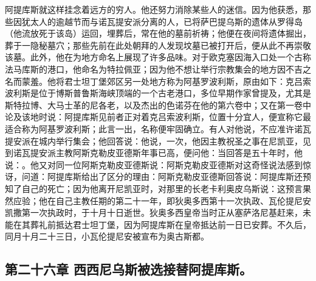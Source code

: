 阿提库斯就这样挂念着远方的穷人。他还努力消除某些人的迷信。因为他获悉，那些因犹太人的逾越节而与诺瓦提安派分离的人，已将萨巴提乌斯的遗体从罗得岛（他流放死于该岛）运回，埋葬后，常在他的墓前祈祷；他便在夜间将遗体掘出，葬于一隐秘墓穴；那些先前在此处朝拜的人发现坟墓已被打开后，便从此不再崇敬该墓。此外，他在为地方命名上展现了许多品味。对于欧克塞因海入口处一个古称法马库斯的港口，他命名为特拉佩亚；因为他不想让举行宗教集会的地方因不吉之名而蒙羞。他将君士坦丁堡郊区另一处地方称为阿基罗波利斯，原由如下：克吕索波利斯是位于博斯普鲁斯海峡顶端的一个古老港口，多位早期作家曾提及，尤其是斯特拉博、大马士革的尼各老，以及杰出的色诺芬在他的第六卷中；又在第一卷中论及该地时说：阿提库斯见前者正对着克吕索波利斯，位置十分宜人，便宣称它最适合称为阿基罗波利斯；此言一出，名称便牢固确立。有人对他说，不应准许诺瓦提安派在城内举行集会；他回答说：他说，一次，他因主教祝圣之事在尼凯亚，见到诺瓦提安派主教阿斯克勒皮亚德斯年事已高，便问他：当回答是五十年时，他说：。他又对同一位阿斯克勒皮亚德斯说：阿斯克勒皮亚德斯对这奇怪说法感到惊讶，问道：阿提库斯给出了区分的理由：阿斯克勒皮亚德斯回答说：阿提库斯还预知了自己的死亡；因为他离开尼凯亚时，对那里的长老卡利奥皮乌斯说：这预言果然应验；他在自己主教任期的第二十一年，即狄奥多西第十一次执政、瓦伦提尼安凯撒第一次执政时，于十月十日逝世。狄奥多西皇帝当时正从塞萨洛尼基赶来，未能在其葬礼前抵达君士坦丁堡，因为阿提库斯在皇帝抵达前一日已安葬。不久后，同月十月二十三日，小瓦伦提尼安被宣布为奥古斯都。\newline{}\par


\subsection{第二十六章 西西尼乌斯被选接替阿提库斯。}

